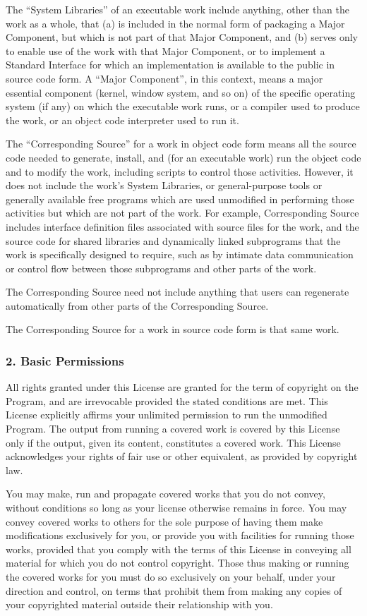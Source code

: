 \documentclass[a4paper, 11pt, twoside]{article}
\begin{document}
The “System Libraries” of an executable work include anything, other than the work as a whole, that (a) is included in the normal form of packaging a Major Component, but which is not part of that Major Component, and (b) serves only to enable use of the work with that Major Component, or to implement a Standard Interface for which an implementation is available to the public in source code form. A “Major Component”, in this context, means a major essential component (kernel, window system, and so on) of the specific operating system (if any) on which the executable work runs, or a compiler used to produce the work, or an object code interpreter used to run it.

The “Corresponding Source” for a work in object code form means all the source code needed to generate, install, and (for an executable work) run the object code and to modify the work, including scripts to control those activities. However, it does not include the work's System Libraries, or general-purpose tools or generally available free programs which are used unmodified in performing those activities but which are not part of the work. For example, Corresponding Source includes interface definition files associated with source files for the work, and the source code for shared libraries and dynamically linked subprograms that the work is specifically designed to require, such as by intimate data communication or control flow between those subprograms and other parts of the work.

The Corresponding Source need not include anything that users can regenerate automatically from other parts of the Corresponding Source.

The Corresponding Source for a work in source code form is that same work.

\subsubsection{2. Basic Permissions}

All rights granted under this License are granted for the term of copyright on the Program, and are irrevocable provided the stated conditions are met. This License explicitly affirms your unlimited permission to run the unmodified Program. The output from running a covered work is covered by this License only if the output, given its content, constitutes a covered work. This License acknowledges your rights of fair use or other equivalent, as provided by copyright law.

You may make, run and propagate covered works that you do not convey, without conditions so long as your license otherwise remains in force. You may convey covered works to others for the sole purpose of having them make modifications exclusively for you, or provide you with facilities for running those works, provided that you comply with the terms of this License in conveying all material for which you do not control copyright. Those thus making or running the covered works for you must do so exclusively on your behalf, under your direction and control, on terms that prohibit them from making any copies of your copyrighted material outside their relationship with you.
\end{document}
